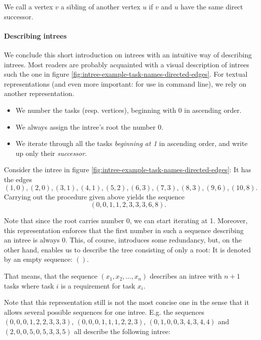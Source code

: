 \begin{definition}[Siblings]
  We call a vertex $v$ a sibling of another vertex $u$ if $v$ and $u$ have the same direct successor.
\end{definition}

\paragraph{Describing intrees}

We conclude this short introduction on intrees with an intuitive way of describing intrees. Most readers are probably acquainted with a visual description of intrees such the one in figure \ref{fig:intree-example-task-names-directed-edges}. For textual representations (and even more important: for use in command line), we rely on another representation. 

\begin{itemize}
\item We number the tasks (resp. vertices), beginning with 0 in
  ascending order.
\item We always assign the intree's root the number 0.
\item We iterate through all the tasks \emph{beginning at 1} in ascending order, and write up only their \emph{successor}.
\end{itemize}

Consider the intree in figure \ref{fig:intree-example-task-names-directed-edges}: It has the edges
\begin{equation*}
  (1,0), (2,0), (3,1), (4,1), (5,2), (6,3), (7,3), (8,3), (9,6), (10, 8).
\end{equation*}
Carrying out the procedure given above yields the sequence
\begin{equation*}
  (0, 0, 1, 1, 2, 3, 3, 3, 6, 8).
\end{equation*}

Note that since the root carries number 0, we can start iterating at 1. Moreover, this representation enforces that the first number in such a sequence describing an intree is always 0. This, of course, introduces some redundancy, but, on the other hand, enables us to describe the tree consisting of only a root: It is denoted by an empty sequence: $()$.

That means, that the sequence $(x_1,x_2,\dots,x_n)$ describes an intree with $n+1$ tasks where task $i$ is a requirement for task $x_i$.

Note that this representation still is not the most concise one in the sense that it allows several possible sequences for one intree. E.g. the sequences $(0,0,0,1,2,2,3,3,3)$, $(0,0,0,1,1,1,2,2,3)$, $(0,1,0,0,3,4,3,4,4)$ and $(2,0,0,5,0,5,3,3,5)$ all describe the following intree:

